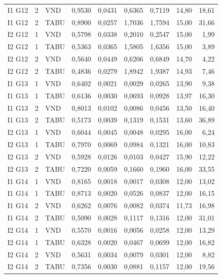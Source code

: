 \begin{longtable}{lrlrrrrrr}
I1 G12 & 2 & VND & 0,9530 & 0,0431 & 0,6365 & 0,7119 & 14,80 & 18,61 \\
I1 G12 & 2 & TABU & 0,8900 & 0,0257 & 1,7036 & 1,7594 & 15,00 & 31,66 \\
I2 G12 & 1 & VND & 0,5798 & 0,0338 & 0,2010 & 0,2547 & 15,00 & 1,99 \\
I2 G12 & 1 & TABU & 0,5363 & 0,0365 & 1,5805 & 1,6356 & 15,00 & 3,89 \\
I2 G12 & 2 & VND & 0,5640 & 0,0449 & 0,6206 & 0,6849 & 14,70 & 4,22 \\
I2 G12 & 2 & TABU & 0,4836 & 0,0279 & 1,8942 & 1,9387 & 14,93 & 7,46 \\
I1 G13 & 1 & VND & 0,6402 & 0,0021 & 0,0029 & 0,0265 & 13,90 & 9,38 \\
I1 G13 & 1 & TABU & 0,6136 & 0,0030 & 0,0693 & 0,0928 & 13,97 & 16,30 \\
I1 G13 & 2 & VND & 0,8013 & 0,0102 & 0,0086 & 0,0456 & 13,50 & 16,40 \\
I1 G13 & 2 & TABU & 0,5173 & 0,0039 & 0,1319 & 0,1531 & 13,60 & 36,89 \\
I2 G13 & 1 & VND & 0,6044 & 0,0045 & 0,0048 & 0,0295 & 16,00 & 6,24 \\
I2 G13 & 1 & TABU & 0,7970 & 0,0069 & 0,0984 & 0,1321 & 16,00 & 10,83 \\
I2 G13 & 2 & VND & 0,5928 & 0,0126 & 0,0103 & 0,0427 & 15,90 & 12,22 \\
I2 G13 & 2 & TABU & 0,7220 & 0,0059 & 0,1660 & 0,1960 & 16,00 & 33,55 \\
I1 G14 & 1 & VND & 0,8165 & 0,0018 & 0,0017 & 0,0308 & 12,00 & 13,02 \\
I1 G14 & 1 & TABU & 0,8713 & 0,0020 & 0,0526 & 0,0837 & 12,00 & 16,15 \\
I1 G14 & 2 & VND & 0,6262 & 0,0076 & 0,0082 & 0,0374 & 11,73 & 16,98 \\
I1 G14 & 2 & TABU & 0,5090 & 0,0028 & 0,1117 & 0,1316 & 12,00 & 31,01 \\
I2 G14 & 1 & VND & 0,5570 & 0,0016 & 0,0056 & 0,0258 & 12,00 & 13,29 \\
I2 G14 & 1 & TABU & 0,6328 & 0,0020 & 0,0467 & 0,0699 & 12,00 & 16,82 \\
I2 G14 & 2 & VND & 0,5631 & 0,0034 & 0,0079 & 0,0301 & 12,00 & 8,82 \\
I2 G14 & 2 & TABU & 0,7356 & 0,0030 & 0,0881 & 0,1157 & 12,00 & 19,56 \\
\bottomrule\end{longtable}
\normalsize
